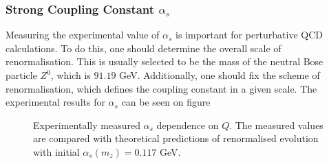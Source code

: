 \subsubsection{Strong Coupling Constant $\alpha_s$}
    Measuring the experimental value of $\alpha_s$ is important for perturbative QCD calculations.
    To do this, one should determine the overall scale of renormalisation.
    This is usually selected to be the mass of the neutral Bose particle $Z^0$, which is $91.19$ GeV.
    Additionally, one should fix the scheme of renormalisation, which defines the coupling constant in a given scale.
    The experimental results for $\alpha_s$ can be seen on figure

    \begin{figure}[b!] %
        \centering{}
        \caption[$\alpha_s$ dependence on $Q^2$.]{Experimentally measured $\alpha_s$ dependence on $Q$.
        The measured values are compared with theoretical predictions of renormalised evolution with initial $\alpha_s(m_z) = 0.117$ GeV.}
        \label{fig::alpha_q_dependence}
    \end{figure}
